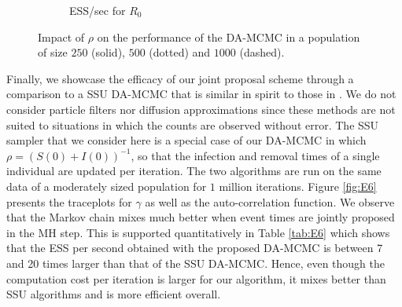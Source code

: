 \documentclass[11pt]{article}
\begin{document}
\begin{figure}
\begin{subfigure}[b]{0.32\textwidth}
			\caption{ESS/sec for $R_0$
			}
			\label{fig:E3_facet_ESSsecR0}
		\end{subfigure}
		\caption{Impact of $\rho$ on the performance of the DA-MCMC in a population of size $250$ (solid), $500$ (dotted) and $1000$ (dashed).}
		\label{fig:E3}
	\end{figure}
		
	Finally, we showcase the efficacy of our joint proposal scheme through a comparison %
	to a SSU DA-MCMC that is similar in spirit to those in \cite{Gibson.1998, ONeill.1999, Fintzi.2017}. We do not consider particle filters \cite{King.2015} nor diffusion approximations \cite{Fintzi.2020} since these methods are not suited to situations in which the counts are observed without error.
	The SSU sampler that we consider here is a special case of our DA-MCMC in which $\rho = (S(0)+I(0))^{-1}$, so that the infection and removal times of a single individual are updated per iteration. The two algorithms are run on the same data of a moderately sized population for $1$ million iterations. Figure \ref{fig:E6} presents the traceplots for $\gamma$ as well as the auto-correlation function. We observe that the Markov chain mixes much better when event times are jointly proposed in the MH step. This is supported quantitatively in Table \ref{tab:E6} which shows that the ESS per second obtained with the proposed DA-MCMC is between 7 and 20 times larger than that of the SSU DA-MCMC. Hence, even though the computation cost per iteration is larger for our algorithm, it mixes better than SSU algorithms and is more efficient overall.
	
\end{document}

